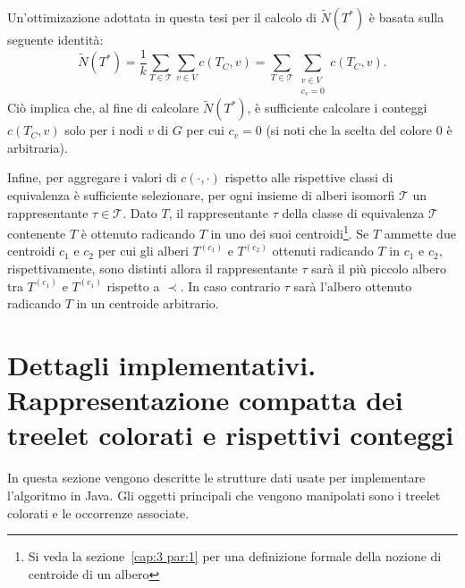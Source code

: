 


Un'ottimizazione adottata in questa tesi per il calcolo di $\widetilde{N}(T^*)$ è basata sulla seguente identità:
\[
\widetilde{N}(T^*) = \frac{1}{k}\sum_{T \in \mathcal{T}} \sum_{v \in V} c( T_C, v)
=
\sum_{T \in \mathcal{T}} \sum_{\substack{v \in V \\ c_v = 0}} c( T_C, v).
\]
Ciò implica che, al fine di calcolare $\widetilde{N}(T^*)$, è sufficiente calcolare i conteggi $ c(T_C,v) $ solo per i nodi $v$ di $G$ per cui $ c_v = 0 $ (si noti che la scelta del colore $0$ è arbitraria).


Infine, per aggregare i valori di $c(\cdot, \cdot)$
rispetto alle rispettive classi di equivalenza è sufficiente
selezionare, per ogni insieme di alberi isomorfi $\mathcal{T}$ un rappresentante $\tau \in \mathcal{T}$.
Dato $T$, il rappresentante $\tau$ della classe di equivalenza $\mathcal{T}$ contenente $T$ è ottenuto radicando $T$ in uno dei suoi centroidi\footnote{Si veda la sezione~\ref{cap:3 par:1} per una definizione formale della nozione di centroide di un albero}.
Se $T$ ammette due centroidi $c_1$ e $c_2$ per cui
gli alberi
$T^{(c_1)}$ e $T^{(c_2)}$  ottenuti radicando $T$ in $c_1$ e $c_2$, rispettivamente, sono distinti allora il rappresentante $\tau$ sarà il più piccolo albero tra $T^{(c_1)}$ e $T^{(c_1)}$ rispetto a $\prec$.
In caso contrario $\tau$ sarà l'albero ottenuto radicando $T$ in un centroide arbitrario.





\section{Dettagli implementativi. Rappresentazione compatta dei treelet colorati e rispettivi conteggi}
\label{section 2}
In questa sezione vengono descritte le strutture dati usate per implementare l'algoritmo in Java.
Gli oggetti principali che vengono manipolati sono i treelet colorati e le occorrenze associate.

